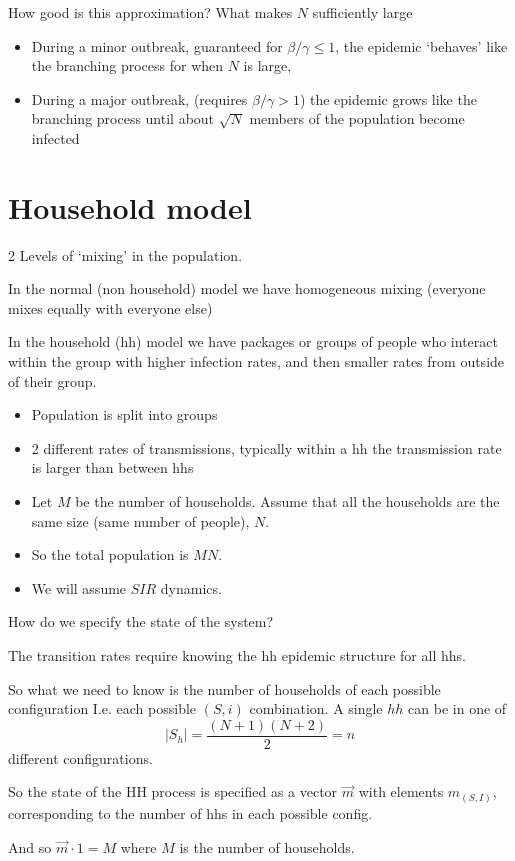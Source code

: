 \documentclass{X:/Documents/Coding/Latex/myassignment}
\begin{document}
How good is this approximation? What makes $N$ sufficiently large
\begin{itemize}
    \item During a minor outbreak, guaranteed for $\beta/\gamma \leq 1$, the epidemic `behaves' like the branching process for when $N$ is large,
    \item During a major outbreak, (requires $\beta/\gamma >1$) the epidemic grows like the branching process until about $\sqrt{N}$ members of the population become infected
\end{itemize}

\section{Household model}
2 Levels of `mixing' in the population.

In the normal (non household) model we have homogeneous mixing (everyone mixes equally with everyone else)

In the household (hh) model we have packages or groups of people who interact within the group with higher infection rates, and then smaller rates from outside of their group.

\begin{itemize}
    \item Population is split into groups
    \item 2 different rates of transmissions, typically within a hh the transmission rate is larger than between hhs\
    \item Let $M$ be the number of households. Assume that all the households are the same size (same number of people), $N$.
    \item So the total population is $MN$.
    \item We will assume $SIR$ dynamics.
\end{itemize}
How do we specify the state of the system?

The transition rates require knowing the hh epidemic structure for all hhs.

So what we need to know is the number of households of each possible configuration I.e. each possible $(S,i)$ combination. 
A single $hh$ can be in one of 
\[|S_h| = \frac{(N+1)(N+2)}2 = n\]
different configurations.


So the state of the HH process is specified as a vector $\vec m$ with elements $m_{(S,I)}$, corresponding to the number of hhs in each possible config.

And so $\vec m \cdot 1 = M$ where $M$ is the number of households.
\end{document}
